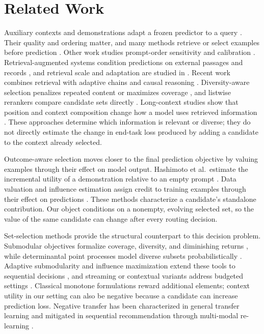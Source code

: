\section{Related Work}

Auxiliary contexts and demonstrations adapt a frozen predictor to a query
\citep{brown2020language,min2022rethinking}. Their quality and ordering matter,
and many methods retrieve or select examples before prediction
\citep{liu2022what,rubin2022learning,zhang2022active,su2023selective}. Other
work studies prompt-order sensitivity and calibration
\citep{lu2022fantastically,zhao2021calibrate}. Retrieval-augmented systems
condition predictions on external passages and records
\citep{guu2020realm,lewis2020retrieval,karpukhin2020dense}, and
retrieval scale and adaptation are studied in
\citep{borgeaud2022improving,izacard2023atlas,shi2024replug,asai2024selfrag}.
Recent work combines retrieval with adaptive chains and causal reasoning
\citep{acra2025retrieval,crgs2026causal}. Diversity-aware selection penalizes
repeated content or maximizes coverage \citep{carbonell1998use,gupta-etal-2023-coverage,levy2023diverse},
and listwise rerankers compare candidate sets directly
\citep{nogueira2019passage,ma2023zero,qin2024large,sun2023chatgpt,sachan2022improving}.
Long-context studies show that position and context composition change how a
model uses retrieved information \citep{liu2024lost}. These approaches
determine which information is relevant or diverse; they do not directly
estimate the change in end-task loss produced by adding a candidate to the
context already selected.

Outcome-aware selection moves closer to the final prediction objective by
valuing examples through their effect on model output. Hashimoto et al.\
estimate the incremental utility of a demonstration relative to an empty
prompt \citep{hashimoto-etal-2024-take}. Data valuation and influence
estimation assign credit to training examples through their effect on
predictions \citep{ghorbani2019data,koh2017understanding,pruthi2020estimating,ilyas2022datamodels}.
These methods characterize a candidate's standalone contribution. Our object
conditions on a nonempty, evolving selected set, so the value of the same
candidate can change after every routing decision.

Set-selection methods provide the structural counterpart to this decision
problem. Submodular objectives formalize coverage, diversity, and diminishing
returns \citep{lin2011class,nemhauser1978analysis,krause2014submodular}, while
determinantal point processes model diverse subsets probabilistically
\citep{kulesza2012determinantal}. Adaptive submodularity and influence
maximization extend these tools to sequential decisions
\citep{golovin2011adaptive,leskovec2007cost}, and streaming or contextual
variants address budgeted settings
\citep{badanidiyuru2014streaming,ross2013contextual}. Classical monotone
formulations reward additional elements; context utility in our setting can
also be negative because a candidate can increase prediction loss. Negative
transfer has been characterized in general transfer learning
\citep{pan2010survey,torrey2010transfer,wang2019characterizing} and mitigated
in sequential recommendation through multi-modal re-learning
\citep{ant2025negative}.

